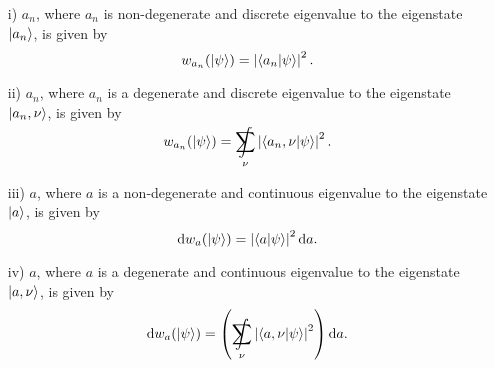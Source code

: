 \begin{description}
				\begin{itemize}
					\item[i)] $a_n$, where $a_n$ is non-degenerate and discrete eigenvalue to the eigenstate $\Ket{a_n}$, is given by
					\begin{equation}
						w_{a_n}(\Ket{\psi}) = \left| \braket{a_n|\psi} \right|^2.
					\end{equation}
					\item[ii)] $a_n$, where $a_n$ is a degenerate and discrete eigenvalue to the eigenstate $\Ket{a_n,\nu}$, is given by
					\begin{equation}
						w_{a_n}(\Ket{\psi}) = \SumInt_\nu \left|\braket{a_n ,\nu|\psi}\right|^2.
					\end{equation}
					\item[iii)] $a$, where $a$ is a non-degenerate and continuous eigenvalue to the eigenstate $\Ket{a}$, is given by
					\begin{equation}
						\mathrm{d} w_a(\Ket{\psi}) = \left| \braket{a|\psi} \right|^2 \mathrm{d} a.
					\end{equation}
					\item[iv)] $a$, where $a$ is a degenerate and continuous eigenvalue to the eigenstate $\Ket{a, \nu}$, is given by
					\begin{equation}
						\diff w_a(\Ket{\psi}) = \left( \SumInt_\nu \left| \braket{a,\nu |\psi} \right|^2 \right) \diff a.

\end{equation}
\end{itemize}
\end{description}
